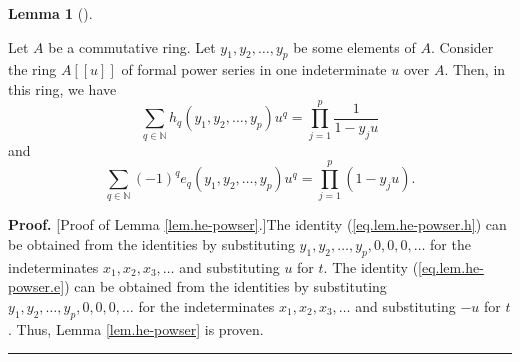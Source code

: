 \documentclass[numbers=enddot,12pt,final,onecolumn,notitlepage]{scrartcl}%
\theoremstyle{definition}
\newtheorem{lem}[theo]{Lemma}
\newenvironment{lemma}[1][]
{\begin{lem}[#1]\begin{leftbar}}
{\end{leftbar}\end{lem}}
\newenvironment{proof}[1][Proof]{\noindent\textbf{#1.} }{\ \rule{0.5em}{0.5em}}
\let\sumnonlimits\sum
\let\prodnonlimits\prod
\renewcommand{\sum}{\sumnonlimits\limits}
\renewcommand{\prod}{\prodnonlimits\limits}
\begin{document}
\begin{lemma}
\label{lem.he-powser}Let $A$ be a commutative ring. Let $y_{1},y_{2}%
,\ldots,y_{p}$ be some elements of $A$. Consider the ring $A\left[  \left[
u\right]  \right]  $ of formal power series in one indeterminate $u$ over $A$.
Then, in this ring, we have%
\begin{equation}
\sum_{q\in\mathbb{N}}h_{q}\left(  y_{1},y_{2},\ldots,y_{p}\right)  u^{q}%
=\prod_{j=1}^{p}\dfrac{1}{1-y_{j}u} \label{eq.lem.he-powser.h}%
\end{equation}
and%
\begin{equation}
\sum_{q\in\mathbb{N}}\left(  -1\right)  ^{q}e_{q}\left(  y_{1},y_{2}%
,\ldots,y_{p}\right)  u^{q}=\prod_{j=1}^{p}\left(  1-y_{j}u\right)  .
\label{eq.lem.he-powser.e}%
\end{equation}

\end{lemma}

\begin{proof}
[Proof of Lemma \ref{lem.he-powser}.]The identity (\ref{eq.lem.he-powser.h})
can be obtained from the identities \cite[(2.2.18)]{GriRei18} by substituting
$y_{1},y_{2},\ldots,y_{p},0,0,0,\ldots$ for the indeterminates $x_{1}%
,x_{2},x_{3},\ldots$ and substituting $u$ for $t$. The identity
(\ref{eq.lem.he-powser.e}) can be obtained from the identities \cite[(2.2.19)]%
{GriRei18} by substituting $y_{1},y_{2},\ldots,y_{p},0,0,0,\ldots$ for the
indeterminates $x_{1},x_{2},x_{3},\ldots$ and substituting $-u$ for $t$. Thus,
Lemma \ref{lem.he-powser} is proven.
\end{proof}
\end{document}
